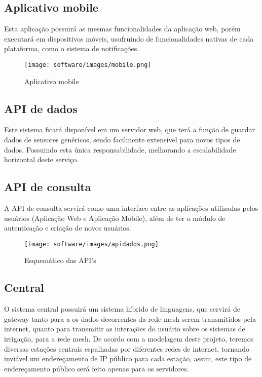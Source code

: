     \subsection{Aplicativo mobile}

    Esta aplicação possuirá as mesmas funcionalidades da aplicação web, porém executará em dispositivos móveis, usufruindo de funcionalidades nativas de cada plataforma, como o sistema de notificações.

    \begin{figure}[H]
    	
    	\centering
        \texttt{[image: software/images/mobile.png]}
        \caption{Aplicativo mobile}
        \label{fig:mobile}
    \end{figure}

    \subsection{API de dados}

    Este sistema ficará disponível em um servidor web, que terá a função de guardar dados de sensores genéricos, sendo facilmente extensível para novos tipos de dados. Possuindo esta única responsabilidade, melhorando a escalabilidade horizontal deste serviço.

    \subsection{API de consulta}

    A API de consulta servirá como uma interface entre as aplicações utilizadas pelos usuários (Aplicação Web e Aplicação Mobile), além de ter o módulo de autenticação e criação de novos usuários.

    \begin{figure}[H]
    	\centering
        \texttt{[image: software/images/apidados.png]}
        \caption{Esquemático das API's}
        \label{fig:apidados}
    \end{figure}

    \subsection{Central}

    O sistema central possuirá um sistema híbrido de linguagens, que servirá de gateway  tanto para a os dados decorrentes da rede mesh serem transmitidos pela internet, quanto para transmitir as interações do usuário sobre os sistemas de irrigação, para a rede mesh. 
	De acordo com a modelagem deste projeto, teremos diversas estações centrais espalhadas por diferentes redes de internet, tornando inviável um endereçamento de IP público para cada estação, assim, este tipo de endereçamento público será feito apenas para os servidores.
    
